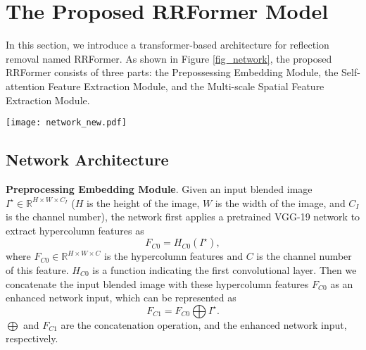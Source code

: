 \documentclass[10pt,journal]{IEEEtran}
\begin{document}
\section{The Proposed RRFormer Model}
In this section, we introduce a transformer-based architecture for reflection removal named RRFormer. 
As shown in Figure \ref{fig_network}, the proposed RRFormer consists of three parts: the Prepossessing Embedding Module, the Self-attention Feature Extraction Module, and the Multi-scale Spatial Feature Extraction Module. 


\begin{figure*}[t]
	\centering
	\texttt{[image: network\_new.pdf]}
	\caption{The architecture of the proposed RRFormer. It consists of three parts: Prepossessing Embedding Module, Self-attention Feature Extraction Module, and Multi-scale Spatial Feature Extraction Module. }
	\label{fig_network}
\end{figure*}


\subsection{Network Architecture}

\textbf{Preprocessing Embedding Module}. 
Given an input blended image $I^\star\in \mathbb{R}^{ H\times W\times C_{I}}$ ($H$ is the height of the image, $W$ is the width of the image, and $C_{I}$ is the channel number), the network first applies a pretrained VGG-19 network \cite{szeliskiLayerExtractionMultiple2000} to extract hypercolumn \cite{hariharanHypercolumnsObjectSegmentation2015} features as 
\begin{equation}
	F_{C0}=H_{C0} \left ( I^\star \right ) 
	, \label{eq1}
\end{equation}
where $F_{C0}\in \mathbb{R}^{ H\times W\times C}$ is the hypercolumn features and $C$ is the channel number of this feature. 
$H_{C0}$ is a function indicating the first convolutional layer.
Then we concatenate the input blended image with these hypercolumn features $F_{C0}$ as an enhanced network input, which can be represented as 
\begin{equation}
	F_{C1} = F_{C0}\bigoplus I^\star 
	. \label{eq2}
\end{equation}
$\bigoplus$ and $F_{C1}$ are the concatenation operation, and the enhanced network input, respectively. 
\end{document}
